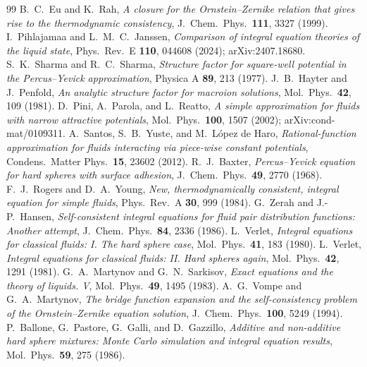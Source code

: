 \documentclass[11pt,a4paper]{article}
\begin{document}
\begin{thebibliography}{99}
B.~C.~Eu and K.~Rah,
\emph{A closure for the Ornstein--Zernike relation that gives rise to the
thermodynamic consistency},
J.\ Chem.\ Phys.\ \textbf{111}, 3327 (1999).
I.~Pihlajamaa and L.~M.~C.~Janssen,
\emph{Comparison of integral equation theories of the liquid state},
Phys.\ Rev.\ E \textbf{110}, 044608 (2024); arXiv:2407.18680.
S.~K.~Sharma and R.~C.~Sharma,
\emph{Structure factor for square-well potential in the Percus--Yevick
approximation},
Physica A \textbf{89}, 213 (1977).
J.~B.~Hayter and J.~Penfold,
\emph{An analytic structure factor for macroion solutions},
Mol.\ Phys.\ \textbf{42}, 109 (1981).
D.~Pini, A.~Parola, and L.~Reatto,
\emph{A simple approximation for fluids with narrow attractive potentials},
Mol.\ Phys.\ \textbf{100}, 1507 (2002); arXiv:cond-mat/0109311.
A.~Santos, S.~B.~Yuste, and M.~L\'opez de Haro,
\emph{Rational-function approximation for fluids interacting via piece-wise
constant potentials},
Condens.\ Matter Phys.\ \textbf{15}, 23602 (2012).
R.~J.~Baxter,
\emph{Percus--Yevick equation for hard spheres with surface adhesion},
J.\ Chem.\ Phys.\ \textbf{49}, 2770 (1968).
F.~J.~Rogers and D.~A.~Young,
\emph{New, thermodynamically consistent, integral equation for simple
fluids},
Phys.\ Rev.\ A \textbf{30}, 999 (1984).
G.~Zerah and J.-P.~Hansen,
\emph{Self-consistent integral equations for fluid pair distribution
functions: Another attempt},
J.\ Chem.\ Phys.\ \textbf{84}, 2336 (1986).
L.~Verlet,
\emph{Integral equations for classical fluids: I. The hard sphere case},
Mol.\ Phys.\ \textbf{41}, 183 (1980).
L.~Verlet,
\emph{Integral equations for classical fluids: II. Hard spheres again},
Mol.\ Phys.\ \textbf{42}, 1291 (1981).
G.~A.~Martynov and G.~N.~Sarkisov,
\emph{Exact equations and the theory of liquids. V},
Mol.\ Phys.\ \textbf{49}, 1495 (1983).
A.~G.~Vompe and G.~A.~Martynov,
\emph{The bridge function expansion and the self-consistency problem of the
Ornstein--Zernike equation solution},
J.\ Chem.\ Phys.\ \textbf{100}, 5249 (1994).
P.~Ballone, G.~Pastore, G.~Galli, and D.~Gazzillo,
\emph{Additive and non-additive hard sphere mixtures: Monte Carlo simulation
and integral equation results},
Mol.\ Phys.\ \textbf{59}, 275 (1986).

\end{thebibliography}
\end{document}

